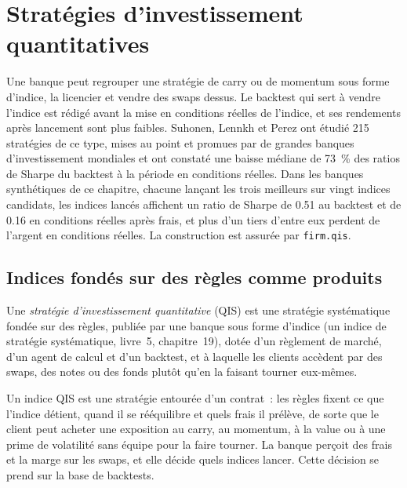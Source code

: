 \chapter{Stratégies d'investissement quantitatives}\label{ch:s2:quantitative-investment-strategies}

Une banque peut regrouper une stratégie de carry ou de momentum sous forme d'indice, la licencier et vendre des swaps dessus. Le backtest qui sert à vendre l'indice est rédigé avant la
mise en conditions réelles de l'indice, et ses rendements après lancement sont plus faibles. Suhonen, Lennkh et Perez ont étudié 215 stratégies de ce type, mises au point et promues par de grandes banques
d'investissement mondiales et ont constaté une baisse médiane de 73~\% des ratios de Sharpe du backtest à la période en conditions réelles. Dans les banques synthétiques de ce chapitre, chacune lançant
les trois meilleurs sur vingt indices candidats, les indices lancés affichent un ratio de Sharpe de 0.51 au backtest et de 0.16 en conditions réelles après frais, et plus d'un tiers
d'entre eux perdent de l'argent en conditions réelles. La construction est assurée par \texttt{firm.qis}.

\section{Indices fondés sur des règles comme produits}

\begin{definition}\label{def:s2:quantitative-investment-strategies:qis}
Une \emph{stratégie d'investissement quantitative} (QIS) est une stratégie systématique fondée sur des règles, publiée par une banque sous forme
d'indice (un indice de stratégie systématique, livre~5, chapitre~19), dotée d'un règlement de marché, d'un agent de calcul et d'un backtest, et à laquelle les clients accèdent par des swaps,
des notes ou des fonds plutôt qu'en la faisant tourner eux-mêmes.
\end{definition}

Un indice QIS est une stratégie entourée d'un contrat~: les règles fixent ce que l'indice détient, quand il se rééquilibre et quels frais il prélève, de sorte que le client
peut acheter une exposition au carry, au momentum, à la value ou à une prime de volatilité sans équipe pour la faire tourner. La banque perçoit des frais et la marge sur les swaps, et elle
décide quels indices lancer. Cette décision se prend sur la base de backtests.

